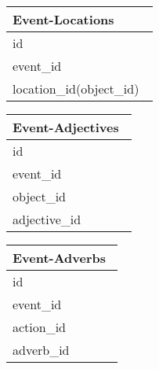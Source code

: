 \documentclass[10pt]{article}
\begin{document}
\begin{multicols}{2}
\begin{tabular}{|p{0.95\linewidth}|} 
\hline                   
\textbf{Event-Locations}
\\
\hline
id\\
\hline
event\_id\\
\hline
location\_id(object\_id)\\
\hline
\end{tabular}



\begin{tabular}{|p{0.95\linewidth}|} 
\hline                   
\textbf{Event-Adjectives}
\\
\hline
id\\
\hline
event\_id\\
\hline
object\_id\\
\hline
adjective\_id\\
\hline
\end{tabular}



\begin{tabular}{|p{0.95\linewidth}|} 
\hline                   
\textbf{Event-Adverbs}
\\
\hline
id\\
\hline
event\_id\\
\hline
action\_id\\
\hline
adverb\_id\\
\hline
\end{tabular}

\end{multicols}











 
\end{document}
